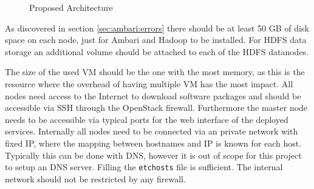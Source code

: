 \begin{figure}
	\caption{\label{fig:architecture}Proposed Architecture}
\end{figure}

As discovered in section \vref{sec:ambari:errors} there should be at least 50 \ac{GB} of disk space on each node, 
just for Ambari and Hadoop to be installed.
For \ac{HDFS} data storage an additional volume should be attached to each of the \ac{HDFS} datanodes.

The size of the used \acs{VM} should be the one with the most memory, 
as this is the resource where the overhead of having multiple \acs{VM} has the most impact.
All nodes need access to the Internet to download software packages and should be accessible via \ac{SSH} through the OpenStack firewall.
Furthermore the master node needs to be accessible via typical ports for the web interface of the deployed services.
Internally all nodes need to be connected via an private network with fixed \acs{IP}, where the mapping between hostnames and \acs{IP} is known for each host. Typically this can be done with \ac{DNS}, however it is out of scope for this project to setup an \ac{DNS} server. Filling the \texttt{\/etc\/hosts} file is sufficient.
The internal network should not be restricted by any firewall.

